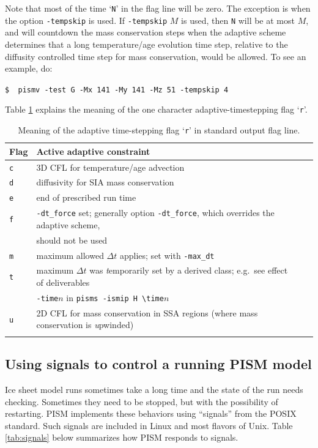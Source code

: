 \documentclass[11pt,final]{amsart}
\begin{document}
Note that most of the time `\verb|N|' in the flag line will be zero.  The exception is when the option \verb|-tempskip| is used.  If \verb|-tempskip| $M$ is used, then \verb|N| will be at most $M$, and will countdown the mass conservation steps when the adaptive scheme determines that a long temperature/age evolution time step, relative to the diffusity controlled time step for mass conservation, would be allowed.  To see an example, do:

\verb|$  pismv -test G -Mx 141 -My 141 -Mz 51 -tempskip 4|

Table \ref{tab:adaptiveflag} explains the meaning of the one character adaptive-timestepping flag `\verb|r|'.

\begin{table}[ht]
\caption{Meaning of the adaptive time-stepping flag `\texttt{r}' in standard output flag line.}\label{tab:adaptiveflag}
\begin{tabular}{@{}llll}\hline
\textbf{Flag} & \textbf{Active adaptive constraint} \\ \hline
\verb|c| & 3D CFL for temperature/age advection \cite{BBL} \\
\verb|d| & diffusivity for SIA mass conservation \cite{BBL} \\
\verb|e| & end of prescribed run time \\
\verb|f| & \verb|-dt_force| set; generally option \verb|-dt_force|, which overrides the adaptive scheme, \\
 & should not be used  \\
\verb|m| & maximum allowed $\Delta t$ applies; set with \verb|-max_dt| \\
\verb|t| & maximum $\Delta t$ was \emph{t}emporarily set by a derived class; e.g.~see effect of deliverables \\
 & \verb|-time|$n$ in \verb|pisms -ismip H \time|$n$ \\
\verb|u| & 2D CFL for mass conservation in SSA regions (where mass conservation is \emph{u}pwinded)\\
\hline
\normalsize
\end{tabular}
\end{table}

\subsection{Using signals to control a running PISM model} \label{subsect:signal}  Ice sheet model runs sometimes take a long time and the state of the run needs checking.  Sometimes they need to be stopped, but with the possibility of restarting.  PISM implements these behaviors using ``signals'' from the POSIX standard.  Such signals are included in Linux and most flavors of Unix.  Table \ref{tab:signals} below summarizes how PISM responds to signals.
\end{document}

